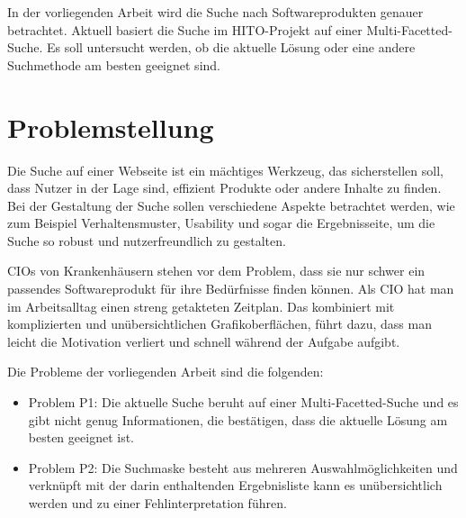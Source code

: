 In der vorliegenden Arbeit wird die Suche nach Softwareprodukten genauer betrachtet. Aktuell basiert die Suche im HITO-Projekt auf einer Multi-Facetted-Suche. Es soll untersucht werden, ob die aktuelle Lösung oder eine andere Suchmethode am besten geeignet sind. 




\section{Problemstellung}\label{sec:problemstellung}

Die Suche auf einer Webseite ist ein mächtiges Werkzeug, das sicherstellen soll, dass Nutzer in der Lage sind, effizient Produkte oder andere Inhalte zu finden. Bei der Gestaltung der Suche sollen verschiedene Aspekte betrachtet werden, wie zum Beispiel Verhaltensmuster, Usability und sogar die Ergebnisseite, um die Suche so robust und nutzerfreundlich zu gestalten.

CIOs von Krankenhäusern stehen vor dem Problem, dass sie nur schwer ein passendes Softwareprodukt für ihre Bedürfnisse finden können. Als CIO hat man im Arbeitsalltag einen streng getakteten Zeitplan. Das kombiniert mit komplizierten und unübersichtlichen Grafikoberflächen, führt dazu, dass man leicht die Motivation verliert und schnell während der Aufgabe aufgibt.

Die Probleme der vorliegenden Arbeit sind die folgenden:

\begin{itemize}
\item Problem P1: Die aktuelle Suche beruht auf einer Multi-Facetted-Suche und es gibt nicht genug Informationen, die bestätigen, dass die aktuelle Lösung am besten geeignet ist.
\item Problem P2: Die Suchmaske besteht aus mehreren Auswahlmöglichkeiten und verknüpft mit der darin enthaltenden Ergebnisliste kann es unübersichtlich werden und zu einer Fehlinterpretation führen.
\end{itemize}

